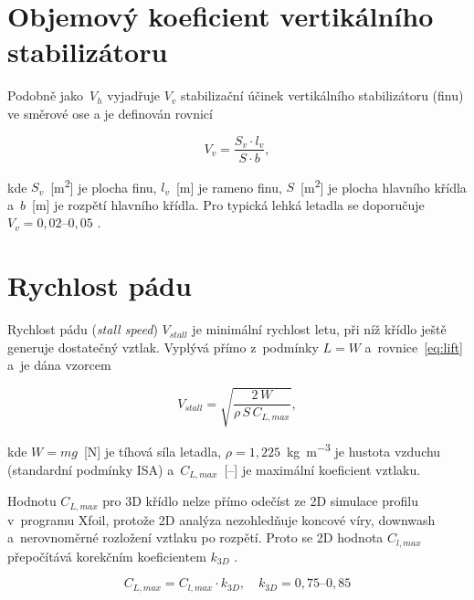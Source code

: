 \documentclass[12pt, a4paper, oneside]{report}
\begin{document}
\section{Objemový koeficient vertikálního stabilizátoru}

Podobně jako~$V_h$ vyjadřuje $V_v$ stabilizační účinek vertikálního
stabilizátoru (finu) ve směrové ose a je definován rovnicí

\begin{equation}
    V_v = \frac{S_v \cdot l_v}{S \cdot b} ,
    \label{eq:Vv}
\end{equation}

kde $S_v$~[\si{\square\metre}] je plocha finu, $l_v$~[\si{\metre}] je rameno finu,
$S$~[\si{\square\metre}] je plocha hlavního křídla a~$b$~[\si{\metre}] je rozpětí
hlavního křídla. Pro typická lehká letadla se doporučuje $V_v = 0{,}02$--$0{,}05$ \cite{drela_lab8}.

\section{Rychlost pádu}

Rychlost pádu (\textit{stall speed}) $V_{stall}$ je minimální rychlost letu,
při níž křídlo ještě generuje dostatečný vztlak. Vyplývá přímo
z~podmínky $L = W$ a~rovnice~\ref{eq:lift} a~je dána vzorcem

\begin{equation}
    V_{stall} = \sqrt{\frac{2\,W}{\rho\,S\,C_{L,max}}} ,
    \label{eq:Vstall}
\end{equation}

kde $W = mg$~[\si{\newton}] je tíhová síla letadla, $\rho = 1{,}225$~\si{\kilogram\per\cubic\metre}
je hustota vzduchu (standardní podmínky ISA) a~$C_{L,max}$~[--] je maximální koeficient
vztlaku.

Hodnotu $C_{L,max}$ pro 3D křídlo nelze přímo odečíst ze 2D simulace profilu
v~programu Xfoil, protože 2D analýza nezohledňuje koncové víry, downwash
a~nerovnoměrné rozložení vztlaku po rozpětí. Proto se 2D hodnota $C_{l,max}$
přepočítává korekčním koeficientem $k_{3D}$ \cite{anderson}.

\begin{equation}
    C_{L,max} = C_{l,max} \cdot k_{3D}, \quad k_{3D} = 0{,}75\text{--}0{,}85
    \label{eq:CLmax3D}
\end{equation}
\end{document}
